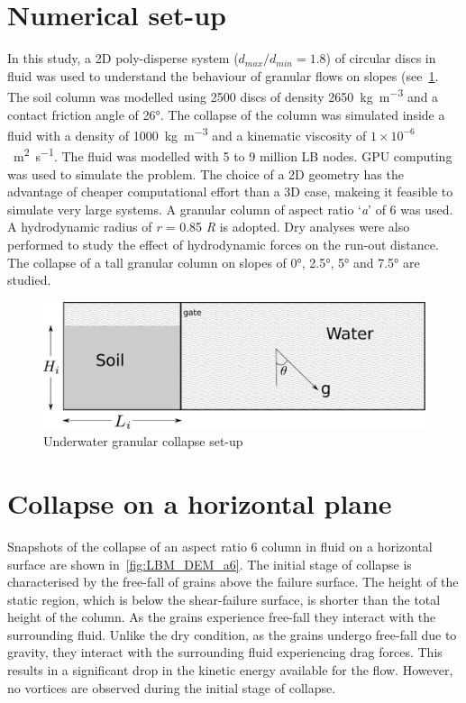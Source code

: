 \documentclass[epj,twocolumn]{webofc}
\begin{document}
\section{Numerical set-up}
In this study, a 2D poly-disperse system ($d_{max} / d_{min} = 1.8$) of
circular discs in fluid was used to understand the behaviour of granular
flows on slopes (see~\cref{fig:geometry}.
The soil column was modelled using 2500 discs of density
2650~\si{\kilogram\per\meter\cubed} and a contact friction angle of
26\si{\degree}.  The  collapse of the column was simulated inside a fluid
with a density of 1000~\si{\kilogram\per\meter\cubed} and a kinematic viscosity
of $1 \times 10^{-6}$~\si{\meter\squared\per\second}. The fluid was modelled
with 5 to 9 million LB nodes. GPU computing was used to simulate the problem.
The choice of a 2D geometry has the advantage of cheaper computational
effort than a 3D case, makeing it feasible to simulate very large systems.
A granular column of aspect ratio `\textit{a}' of 6 was used. A hydrodynamic
radius of \textit{r} = 0.85 \textit{R} is adopted. Dry analyses were also
performed to study the effect of hydrodynamic forces on the run-out distance.
The collapse of a tall granular column on slopes of 0\si{\degree},
2.5\si{\degree}, 5\si{\degree} and 7.5\si{\degree} are studied.

\begin{figure}
  \centering
  \includegraphics[width=0.95\linewidth]{figs/geometry}
  \caption{Underwater granular collapse set-up}
  \label{fig:geometry}
\end{figure}

\section{Collapse on a horizontal plane}
Snapshots of the collapse of an aspect ratio 6 column in fluid on a horizontal 
surface are shown in~\cref{fig:LBM_DEM_a6}. The initial stage of collapse is 
characterised by the free-fall of grains above the failure surface.
The height of the static region, which is below the shear-failure surface,
is shorter than the total height of the column. As the grains experience
free-fall they interact with the surrounding fluid. Unlike the dry condition,
as the grains undergo free-fall due to gravity, they interact 
with the surrounding fluid experiencing drag forces. This results in a 
significant drop in the kinetic energy available for the flow.
However, no vortices are observed during the initial stage of collapse.
\end{document}
